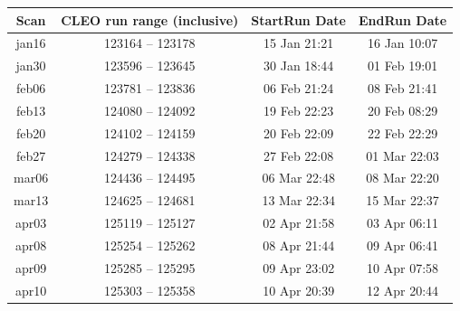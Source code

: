 \documentclass[aps,prd,preprint,superscriptaddress,tightenlines,nofootinbib,floatfix]{revtex4}
\begin{document}
\begin{table}[t]
  \begin{center}
    \renewcommand{\arraystretch}{1.25}
    \begin{tabular}{c | c | c c}
\mbox{\hspace{0.5 cm}} Scan \mbox{\hspace{0.5 cm}}  & \mbox{\hspace{0.5 cm}} CLEO run range (inclusive) \mbox{\hspace{0.5 cm}}  & \mbox{\hspace{0.25 cm}} StartRun Date \mbox{\hspace{0.1 cm}} & \mbox{\hspace{0.1 cm}} EndRun Date \mbox{\hspace{0.25 cm}} \\\hline %
jan16 & 123164 -- 123178 & 15 Jan 21:21 & 16 Jan 10:07 \\ %
jan30 & 123596 -- 123645 & 30 Jan 18:44 & 01 Feb 19:01 \\ %
feb06 & 123781 -- 123836 & 06 Feb 21:24 & 08 Feb 21:41 \\ %
feb13 & 124080 -- 124092 & 19 Feb 22:23 & 20 Feb 08:29 \\ %
feb20 & 124102 -- 124159 & 20 Feb 22:09 & 22 Feb 22:29 \\ %
feb27 & 124279 -- 124338 & 27 Feb 22:08 & 01 Mar 22:03 \\ %
mar06 & 124436 -- 124495 & 06 Mar 22:48 & 08 Mar 22:20 \\ %
mar13 & 124625 -- 124681 & 13 Mar 22:34 & 15 Mar 22:37 \\ %
apr03 & 125119 -- 125127 & 02 Apr 21:58 & 03 Apr 06:11 \\ %
apr08 & 125254 -- 125262 & 08 Apr 21:44 & 09 Apr 06:41 \\ %
apr09 & 125285 -- 125295 & 09 Apr 23:02 & 10 Apr 07:58 \\ %
apr10 & 125303 -- 125358 & 10 Apr 20:39 & 12 Apr 20:44 \\\hline %

\end{tabular}
\end{center}
\end{table}
\end{document}
